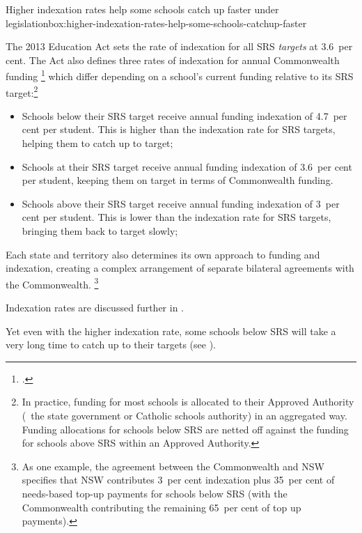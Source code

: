 \documentclass{grattan}
\begin{document}
\begin{smallbox}{Higher indexation rates help some schools catch up faster under legislation}{box:higher-indexation-rates-help-some-schools-catchup-faster}

The 2013 Education Act sets the rate of indexation for all SRS \emph{targets} at 3.6~per cent.
The Act also defines three rates of indexation for annual Commonwealth funding%
\footcite{2013AustralianEducationAct} which differ depending on a school's current funding relative to its SRS target:\footnote{In practice, funding for most schools is allocated to their Approved Authority (\eg~the state government or Catholic schools authority) in an aggregated way.
Funding allocations for schools below SRS are netted off against the funding for schools above SRS within an Approved Authority.}

\begin{itemize}[leftmargin=1.0em]
\item Schools below their SRS target  receive annual funding indexation of 4.7~per cent per student.
This is higher than the indexation rate for SRS targets, helping them to catch up to target;
\item Schools at their SRS target  receive annual funding indexation of 3.6~per cent per student, keeping them on target in terms of Commonwealth funding.
\item Schools above their SRS target  receive annual funding indexation of 3~per cent per student.
This is lower than the indexation rate for SRS targets, bringing them back to target slowly;

\end{itemize}

Each state and territory also determines its own approach to funding and indexation, creating a complex arrangement of separate bilateral agreements with the Commonwealth.%
\footnote{As one example, the agreement between the Commonwealth and NSW specifies that NSW contributes 3~per cent indexation plus 35~per cent of needs-based top-up payments for schools below SRS (with the Commonwealth contributing the remaining 65~per cent of top up payments).}

Indexation rates are discussed further in .
\end{smallbox}

Yet even with the higher indexation rate, some schools below SRS will take a very long time to catch up to their targets (see ).
\end{document}
